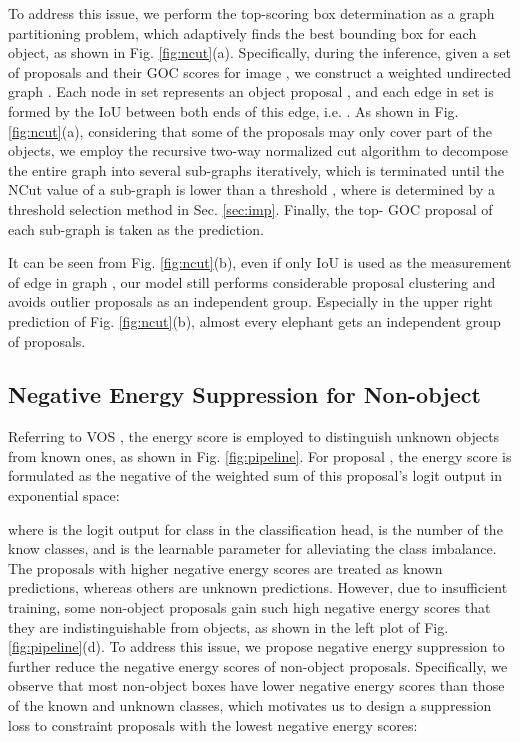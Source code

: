 \documentclass[10pt,twocolumn,letterpaper]{article}
\newcommand{\xf}[1]{{\color{black} #1}}
\begin{document}
To address this issue,
we perform the top-scoring box determination as a graph partitioning problem,
which adaptively finds the best bounding box for each object,
as shown in Fig. \ref{fig:ncut}(a).
Specifically,
during the inference,
given a set of proposals  and their GOC scores  for image ,
we construct a weighted undirected graph .
Each node in set  represents an object proposal ,
and each edge in set  is formed by the IoU between both ends of this edge, i.e. .
As shown in Fig. \ref{fig:ncut}(a),
considering that some of the proposals may only cover part of the objects,
we employ the recursive two-way normalized cut algorithm \cite{ncut} to decompose the entire graph  into several sub-graphs iteratively,
which is terminated until the NCut value \cite{ncut} of a sub-graph is lower than a threshold ,
where  is determined by a threshold selection method in Sec. \ref{sec:imp}.
Finally, the top- GOC proposal of each sub-graph is taken as the prediction.

It can be seen from Fig. \ref{fig:ncut}(b),
even if only IoU is used as the measurement of edge in graph ,
our model still performs considerable proposal clustering and avoids outlier proposals as an independent group.
Especially in the upper right prediction of Fig. \ref{fig:ncut}(b),
almost every elephant gets an independent group of proposals.



\subsection{Negative Energy Suppression for Non-object}
\label{sec:Energy_Suppression}

Referring to VOS \cite{vos},
the energy score is employed to distinguish unknown objects from known ones,
as shown in Fig. \ref{fig:pipeline}.
For proposal ,
the energy score is formulated as the negative of the weighted sum of this proposal's logit output in exponential space:

where  is the logit output for class  in the classification head,
 is the number of the know classes,
and  is the learnable parameter for alleviating the class imbalance.
The proposals with higher negative energy scores are treated as known predictions,
\xf{whereas} others are unknown predictions.
However, due to insufficient training,
some non-object proposals gain such high negative energy scores that they are indistinguishable from objects, as shown in the left plot of Fig. \ref{fig:pipeline}(d).
To address this issue,
we propose negative energy suppression to further reduce the negative energy scores of non-object proposals.
Specifically,
we observe that most non-object boxes have lower negative energy scores than \xf{those} of the known and unknown classes,
which motivates us to design a suppression loss to constraint  proposals with the lowest negative energy scores:
\vspace{-5pt}
\end{document}
